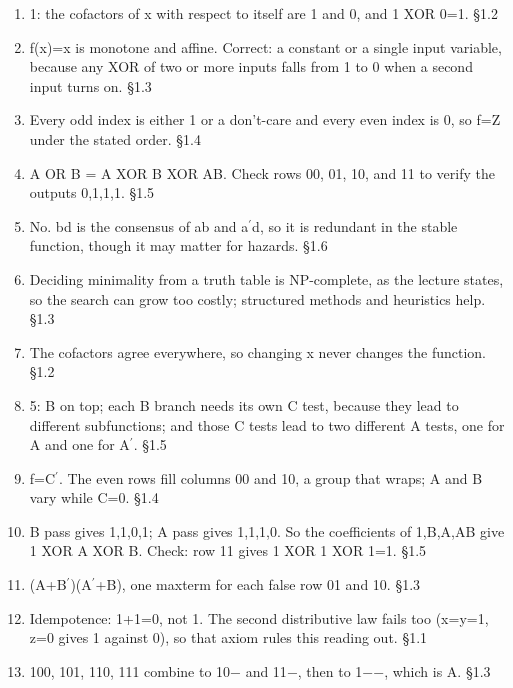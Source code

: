 \documentclass[11pt]{article}
\begin{document}
\begin{keepsection}
\begin{enumerate}
\item 1: the cofactors of x with respect to itself are 1 and 0, and 1 XOR 0=1. \hfill{\small\color{FAUblue}§1.2}
\item f(x)=x is monotone and affine. Correct: a constant or a single input variable, because any XOR of two or more inputs falls from 1 to 0 when a second input turns on. \hfill{\small\color{FAUblue}§1.3}
\item Every odd index is either 1 or a don’t-care and every even index is 0, so f=Z under the stated order. \hfill{\small\color{FAUblue}§1.4}
\item A OR B = A XOR B XOR AB. Check rows 00, 01, 10, and 11 to verify the outputs 0,1,1,1. \hfill{\small\color{FAUblue}§1.5}
\item No. bd is the consensus of ab and a\ensuremath{{}^{\prime}}d, so it is redundant in the stable function, though it may matter for hazards. \hfill{\small\color{FAUblue}§1.6}
\item Deciding minimality from a truth table is NP-complete, as the lecture states, so the search can grow too costly; structured methods and heuristics help. \hfill{\small\color{FAUblue}§1.3}
\item The cofactors agree everywhere, so changing x never changes the function. \hfill{\small\color{FAUblue}§1.2}
\item 5: B on top; each B branch needs its own C test, because they lead to different subfunctions; and those C tests lead to two different A tests, one for A and one for A\ensuremath{{}^{\prime}}. \hfill{\small\color{FAUblue}§1.5}
\item f=C\ensuremath{{}^{\prime}}. The even rows fill columns 00 and 10, a group that wraps; A and B vary while C=0. \hfill{\small\color{FAUblue}§1.4}
\item B pass gives 1,1,0,1; A pass gives 1,1,1,0. So the coefficients of 1,B,A,AB give 1 XOR A XOR B. Check: row 11 gives 1 XOR 1 XOR 1=1. \hfill{\small\color{FAUblue}§1.5}
\item (A+B\ensuremath{{}^{\prime}})(A\ensuremath{{}^{\prime}}+B), one maxterm for each false row 01 and 10. \hfill{\small\color{FAUblue}§1.3}
\item Idempotence: 1+1=0, not 1. The second distributive law fails too (x=y=1, z=0 gives 1 against 0), so that axiom rules this reading out. \hfill{\small\color{FAUblue}§1.1}
\item 100, 101, 110, 111 combine to 10\ensuremath{-} and 11\ensuremath{-}, then to 1\ensuremath{-}\ensuremath{-}, which is A. \hfill{\small\color{FAUblue}§1.3}
\end{enumerate}

\end{keepsection}
\end{document}
